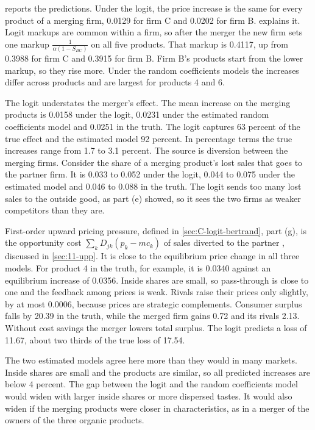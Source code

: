  reports the predictions. Under the logit, the price increase is the same for every product of a
merging firm, 0.0129 for firm C and 0.0202 for firm B.  explains it. Logit
markups are common within a firm, so after the merger the new firm sets one markup $\frac{1}{\alpha(1 - S_{BC})}$ on
all five products. That markup is 0.4117, up from 0.3988 for firm C and 0.3915 for firm B. Firm B's products start from
the lower markup, so they rise more. Under the random coefficients models the increases differ across products and are
largest for products 4 and 6.

The logit understates the merger's effect. The mean increase on the merging products is 0.0158 under the logit, 0.0231
under the estimated random coefficients model and 0.0251 in the truth. The logit captures 63 percent of the true effect
and the estimated model 92 percent. In percentage terms the true increases range from 1.7 to 3.1 percent. The source is
diversion between the merging firms. Consider the share of a merging product's lost sales that goes to the partner firm.
It is 0.033 to 0.052 under the logit, 0.044 to 0.075 under the estimated model and 0.046 to 0.088 in the truth. The logit sends too
many lost sales to the outside good, as part (e) showed, so it sees the two firms as weaker competitors than they are.

First-order upward pricing pressure, defined in \cref{sec:C-logit-bertrand}, part (g), is the opportunity cost
$\sum_kD_{jk}(p_k - mc_k)$ of sales diverted to the partner \citep{FarrellShapiro2010}, discussed in \cref{sec:11-upp}.
It is close to the equilibrium price change in all three models.
For product 4 in the truth, for example, it is 0.0340 against an equilibrium increase of 0.0356. Inside shares are
small, so pass-through is close to one and the feedback among prices is weak. Rivals raise their prices only slightly,
by at most 0.0006, because prices are strategic complements. Consumer surplus falls by 20.39 in the truth, while the
merged firm gains 0.72 and its rivals 2.13. Without cost savings the merger lowers total surplus. The logit predicts
a loss of 11.67, about two thirds of the true loss of 17.54.

The two estimated models agree here more than they would in many markets. Inside shares are small and the products are
similar, so all predicted increases are below 4 percent. The gap
between the logit and the random coefficients model would widen with larger inside shares or more dispersed tastes. It
would also widen if the merging products were closer in characteristics, as in a merger of the owners of the three
organic products.

